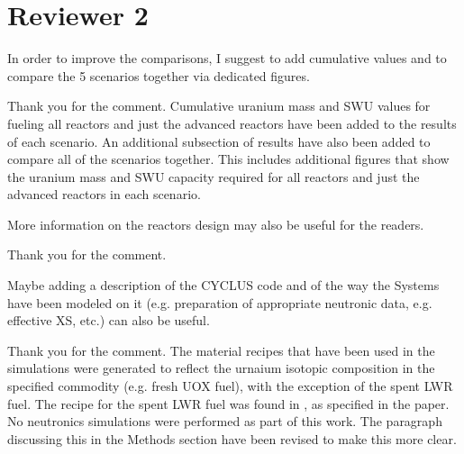 \documentclass[answers,11pt]{exam}
\begin{document}
\section*{Reviewer 2}
\begin{questions}
        \question In order to improve the comparisons, I suggest to add 
        cumulative values and to compare the 5 scenarios together via dedicated 
        figures.
        \begin{solution}
                Thank you for the comment. Cumulative uranium mass and \gls{SWU} values
                for fueling all reactors and just the advanced reactors 
                have been added to the results of each scenario. An additional 
                subsection of results have also been added to compare all of the 
                scenarios together. This includes additional figures that show the 
                uranium mass and SWU capacity required for all reactors and just the 
                advanced reactors in each scenario. 
        \end{solution}

        \question More information on the reactors design may also be useful 
        for the readers.
        \begin{solution}
                Thank you for the comment. 
        \end{solution}

        \question Maybe adding a description of the CYCLUS code and of the way 
        the Systems have been modeled on it (e.g. preparation of appropriate 
        neutronic data, e.g. effective XS, etc.) can also be useful.
        \begin{solution}
                Thank you for the comment. The material recipes that have been used 
                in the simulations were generated to reflect the urnaium isotopic 
                composition in the specified commodity (e.g. fresh UOX fuel), with 
                the exception of the spent \gls{LWR} fuel. The recipe for the spent 
                \gls{LWR} fuel 
                was found in \cite{yacout_visionverifiable_2006}, as specified in 
                the paper. No neutronics simulations were performed as part of this 
                work. The paragraph discussing this in the Methods section have been 
                revised to make this more clear. 
        \end{solution}

\end{questions}


\end{document}
